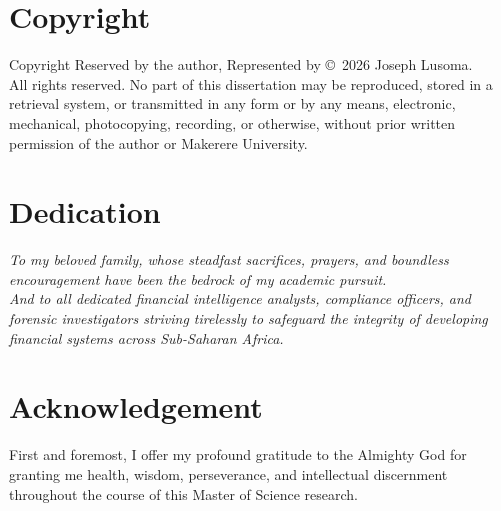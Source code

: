 \documentclass[a4paper,12pt]{report}
\begin{document}
\chapter*{Copyright}
\vspace*{4cm}
\begin{center}
Copyright Reserved by the author, Represented by \copyright\ 2026 Joseph Lusoma.\\[1.5em]
All rights reserved. No part of this dissertation may be reproduced, stored in a retrieval system, or transmitted in any form or by any means, electronic, mechanical, photocopying, recording, or otherwise, without prior written permission of the author or Makerere University.
\end{center}

\newpage
\chapter*{Dedication}
\begin{center}
\vspace*{3.5cm}
\emph{To my beloved family, whose steadfast sacrifices, prayers, and boundless encouragement have been the bedrock of my academic pursuit.}\\
\vspace{2cm}
\emph{And to all dedicated financial intelligence analysts, compliance officers, and forensic investigators striving tirelessly to safeguard the integrity of developing financial systems across Sub-Saharan Africa.}
\end{center}

\newpage
\chapter*{Acknowledgement}
First and foremost, I offer my profound gratitude to the Almighty God for granting me health, wisdom, perseverance, and intellectual discernment throughout the course of this Master of Science research.
\end{document}
